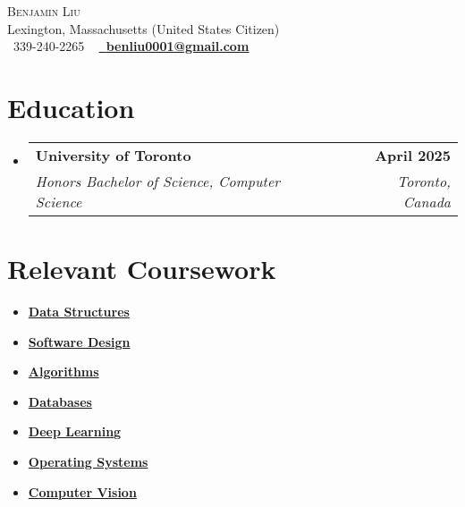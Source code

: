 \documentclass[letterpaper,11pt]{article}
\makeatletter
\let\oldhref\href
\renewcommand{\href}[2]{\oldhref{#1}{\bfseries#2}}
\newcommand{\resumeSubheading}[4]{
  \vspace{-2pt}\item
    \begin{tabular*}{1.0\textwidth}[t]{l@{\extracolsep{\fill}}r}
      \textbf{#1} & \textbf{\small #2} \\
      \textit{\small#3} & \textit{\small #4} \\
    \end{tabular*}\vspace{-7pt}
}
\newcommand{\resumeSubHeadingListStart}{\begin{itemize}[leftmargin=0.0in, label={}]}
\newcommand{\resumeSubHeadingListEnd}{\end{itemize}}
\makeatother
\begin{document}

\begin{center}
    {\Huge \scshape Benjamin Liu} \\ \vspace{1pt}
    Lexington, Massachusetts (United States Citizen) \\ \vspace{1pt}
    \small \raisebox{-0.1\height}\faPhone\ 339-240-2265 ~ \href{mailto:benliu0001@gmail.com}{\raisebox{-0.2\height}\faEnvelope\  \underline{benliu0001@gmail.com}} ~ 
    \vspace{-8pt}
\end{center}


\section{Education}
  \resumeSubHeadingListStart
    \resumeSubheading
      {University of Toronto}{April 2025}
      {Honors Bachelor of Science, Computer Science}{Toronto, Canada}
  \resumeSubHeadingListEnd

\section{Relevant Coursework}
        \begin{multicols}{4}
            \begin{itemize}[itemsep=-5pt, parsep=3pt]
                \item\small \href{https://artsci.calendar.utoronto.ca/course/csc263h1}{Data Structures}
                \item \href{https://artsci.calendar.utoronto.ca/course/csc207h1}{Software Design}
                \item \href{https://artsci.calendar.utoronto.ca/course/csc373h1}{Algorithms}
                \item \href{https://artsci.calendar.utoronto.ca/course/csc343h1}{Databases}
                \item \href{https://artsci.calendar.utoronto.ca/course/csc413h1}{Deep Learning}
                \item \href{https://artsci.calendar.utoronto.ca/course/csc369h1}{Operating Systems}
                \item \href{https://artsci.calendar.utoronto.ca/course/csc420h1}{Computer Vision}
            \end{itemize}
        \end{multicols}
        \vspace*{2.0\multicolsep}
\end{document}
